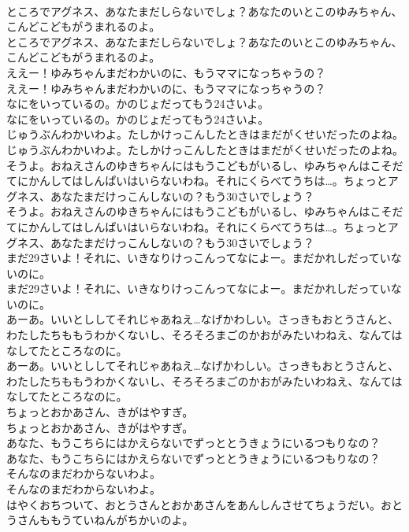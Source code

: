 \documentclass[8pt]{extreport}
\begin{document}
\begin{CJK}{UTF8}{min}
\\	ところでアグネス、あなたまだしらないでしょ？あなたのいとこのゆみちゃん、こんどこどもがうまれるのよ。
\\	ところでアグネス、あなたまだしらないでしょ？あなたのいとこのゆみちゃん、こんどこどもがうまれるのよ。
\\	ええー！ゆみちゃんまだわかいのに、もうママになっちゃうの？
\\	ええー！ゆみちゃんまだわかいのに、もうママになっちゃうの？
\\	なにをいっているの。かのじょだってもう24さいよ。
\\	なにをいっているの。かのじょだってもう24さいよ。
\\	じゅうぶんわかいわよ。たしかけっこんしたときはまだがくせいだったのよね。
\\	じゅうぶんわかいわよ。たしかけっこんしたときはまだがくせいだったのよね。
\\	そうよ。おねえさんのゆきちゃんにはもうこどもがいるし、ゆみちゃんはこそだてにかんしてはしんぱいはいらないわね。それにくらべてうちは…。ちょっとアグネス、あなたまだけっこんしないの？もう30さいでしょう？
\\	そうよ。おねえさんのゆきちゃんにはもうこどもがいるし、ゆみちゃんはこそだてにかんしてはしんぱいはいらないわね。それにくらべてうちは…。ちょっとアグネス、あなたまだけっこんしないの？もう30さいでしょう？
\\	まだ29さいよ！それに、いきなりけっこんってなによー。まだかれしだっていないのに。
\\	まだ29さいよ！それに、いきなりけっこんってなによー。まだかれしだっていないのに。
\\	あーあ。いいとししてそれじゃあねえ…なげかわしい。さっきもおとうさんと、わたしたちももうわかくないし、そろそろまごのかおがみたいわねえ、なんてはなしてたところなのに。
\\	あーあ。いいとししてそれじゃあねえ…なげかわしい。さっきもおとうさんと、わたしたちももうわかくないし、そろそろまごのかおがみたいわねえ、なんてはなしてたところなのに。
\\	ちょっとおかあさん、きがはやすぎ。
\\	ちょっとおかあさん、きがはやすぎ。
\\	あなた、もうこちらにはかえらないでずっととうきょうにいるつもりなの？
\\	あなた、もうこちらにはかえらないでずっととうきょうにいるつもりなの？
\\	そんなのまだわからないわよ。
\\	そんなのまだわからないわよ。
\\	はやくおちついて、おとうさんとおかあさんをあんしんさせてちょうだい。おとうさんももうていねんがちかいのよ。

\end{CJK}
\end{document}
